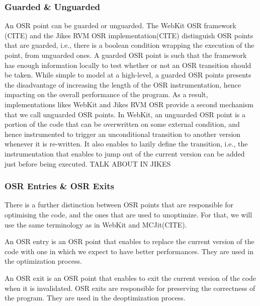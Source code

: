 \subsubsection{Guarded \& Unguarded}

An OSR point can be guarded or unguarded.
The WebKit OSR framework (CITE) and the Jikes RVM OSR implementation(CITE) distinguish OSR points that are guarded, i.e., there is a boolean condition wrapping the execution of the point, from unguarded ones.
A guarded OSR point is such that the framework has enough information locally to test whether or not an OSR transition should be taken.
While simple to model at a high-level, a guarded OSR points presents the disadvantage of increasing the length of the OSR instrumentation, hence impacting on the overall performance of the program.
As a result, implementations likes WebKit and Jikes RVM OSR provide a second mechanism that we call unguarded OSR points.
In WebKit, an unguarded OSR point is a portion of the code that can be overwritten on some external condition, and hence instrumented to trigger an unconditional transition to another version whenever it is re-written.
It also enables to lazily define the transition, i.e., the instrumentation that enables to jump out of the current version can be added just before being executed.
TALK ABOUT IN JIKES\\

\subsubsection{OSR Entries \& OSR Exits}

There is a further distinction between OSR points that are responsible for optimising the code, and the ones that are used to unoptimize.
For that, we will use the same terminology as in WebKit and MCJit(CITE).
\begin{definition}\label{OSREntryDefinition}
An OSR entry is an OSR point that enables to replace the current version of the code with one in which we expect to have better performances.
They are used in the optimization process.
\end{definition}

\begin{definition}
An OSR exit is an OSR point that enables to exit the current version of the code when it is invalidated.
OSR exits are responsible for preserving the correctness of the program.
They are used in the deoptimization process.
\end{definition}

